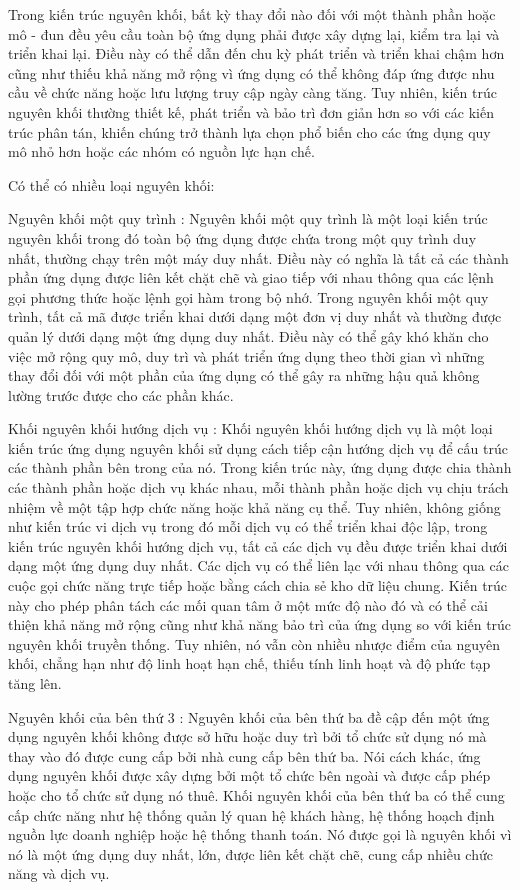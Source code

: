 Trong kiến trúc nguyên khối, bất kỳ thay đổi nào đối với một thành phần hoặc mô - đun đều yêu cầu toàn bộ ứng dụng phải được xây dựng lại, kiểm tra lại và triển khai lại. Điều này có thể dẫn đến chu kỳ phát triển và triển khai chậm hơn cũng như thiếu khả năng mở rộng vì ứng dụng có thể không đáp ứng được nhu cầu về chức năng hoặc lưu lượng truy cập ngày càng tăng. Tuy nhiên, kiến trúc nguyên khối thường thiết kế, phát triển và bảo trì đơn giản hơn so với các kiến trúc phân tán, khiến chúng trở thành lựa chọn phổ biến cho các ứng dụng quy mô nhỏ hơn hoặc các nhóm có nguồn lực hạn chế.

Có thể có nhiều loại nguyên khối:

Nguyên khối một quy trình : Nguyên khối một quy trình là một loại kiến trúc nguyên khối trong đó toàn bộ ứng dụng được chứa trong một quy trình duy nhất, thường chạy trên một máy duy nhất. Điều này có nghĩa là tất cả các thành phần ứng dụng được liên kết chặt chẽ và giao tiếp với nhau thông qua các lệnh gọi phương thức hoặc lệnh gọi hàm trong bộ nhớ. Trong nguyên khối một quy trình, tất cả mã được triển khai dưới dạng một đơn vị duy nhất và thường được quản lý dưới dạng một ứng dụng duy nhất. Điều này có thể gây khó khăn cho việc mở rộng quy mô, duy trì và phát triển ứng dụng theo thời gian vì những thay đổi đối với một phần của ứng dụng có thể gây ra những hậu quả không lường trước được cho các phần khác.

Khối nguyên khối hướng dịch vụ : Khối nguyên khối hướng dịch vụ là một loại kiến trúc ứng dụng nguyên khối sử dụng cách tiếp cận hướng dịch vụ để cấu trúc các thành phần bên trong của nó. Trong kiến trúc này, ứng dụng được chia thành các thành phần hoặc dịch vụ khác nhau, mỗi thành phần hoặc dịch vụ chịu trách nhiệm về một tập hợp chức năng hoặc khả năng cụ thể. Tuy nhiên, không giống như kiến trúc vi dịch vụ trong đó mỗi dịch vụ có thể triển khai độc lập, trong kiến trúc nguyên khối hướng dịch vụ, tất cả các dịch vụ đều được triển khai dưới dạng một ứng dụng duy nhất. Các dịch vụ có thể liên lạc với nhau thông qua các cuộc gọi chức năng trực tiếp hoặc bằng cách chia sẻ kho dữ liệu chung. Kiến trúc này cho phép phân tách các mối quan tâm ở một mức độ nào đó và có thể cải thiện khả năng mở rộng cũng như khả năng bảo trì của ứng dụng so với kiến trúc nguyên khối truyền thống. Tuy nhiên, nó vẫn còn nhiều nhược điểm của nguyên khối, chẳng hạn như độ linh hoạt hạn chế, thiếu tính linh hoạt và độ phức tạp tăng lên.

Nguyên khối của bên thứ 3 : Nguyên khối của bên thứ ba đề cập đến một ứng dụng nguyên khối không được sở hữu hoặc duy trì bởi tổ chức sử dụng nó mà thay vào đó được cung cấp bởi nhà cung cấp bên thứ ba. Nói cách khác, ứng dụng nguyên khối được xây dựng bởi một tổ chức bên ngoài và được cấp phép hoặc cho tổ chức sử dụng nó thuê. Khối nguyên khối của bên thứ ba có thể cung cấp chức năng như hệ thống quản lý quan hệ khách hàng, hệ thống hoạch định nguồn lực doanh nghiệp hoặc hệ thống thanh toán. Nó được gọi là nguyên khối vì nó là một ứng dụng duy nhất, lớn, được liên kết chặt chẽ, cung cấp nhiều chức năng và dịch vụ.

